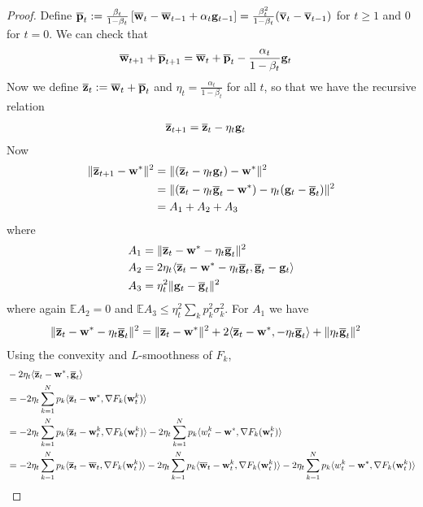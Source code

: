 \begin{proof}
	Define ${\overline{\mathbf{p}}}_{t}:=\frac{\beta_{t}}{1-\beta_{t}}\left[{\overline{\mathbf{w}}}_{t}-{\overline{\mathbf{w}}}_{t-1}+\alpha_{t}{\mathbf{g}}_{t-1}\right]=\frac{\beta_{t}^{2}}{1-\beta_{t}}({\overline{\mathbf{v}}}_{t}-{\overline{\mathbf{v}}}_{t-1})$
	for $t\geq1$ and 0 for $t=0$. We can check that 
	\begin{align*}
	{\overline{\mathbf{w}}}_{t+1}+{\overline{\mathbf{p}}}_{t+1} & ={\overline{\mathbf{w}}}_{t}+{\overline{\mathbf{p}}}_{t}-\frac{\alpha_{t}}{1-\beta_{t}}{\mathbf{g}}_{t}
	\end{align*}
	Now we define ${\overline{\mathbf{z}}}_{t}:={\overline{\mathbf{w}}}_{t}+{\overline{\mathbf{p}}}_{t}$
	and $\eta_{t}=\frac{\alpha_{t}}{1-\beta_{t}}$ for all $t$, so that
	we have the recursive relation 
	\begin{align*}
	{\overline{\mathbf{z}}}_{t+1} & ={\overline{\mathbf{z}}}_{t}-\eta_{t}{\mathbf{g}}_{t}
	\end{align*}
	Now 
	\begin{align*}
	\|{\overline{\mathbf{z}}}_{t+1}-{\mathbf{w}}^{\ast}\|^{2} & =\|({\overline{\mathbf{z}}}_{t}-\eta_{t}{\mathbf{g}}_{t})-{\mathbf{w}}^{\ast}\|^{2}\\
	& =\|({\overline{\mathbf{z}}}_{t}-\eta_{t}{\overline{\mathbf{g}}}_{t}-{\mathbf{w}}^{\ast})-\eta_{t}({\mathbf{g}}_{t}-{\overline{\mathbf{g}}}_{t})\|^{2}\\
	& =A_{1}+A_{2}+A_{3}
	\end{align*}
	where 
	\begin{align*}
	A_{1} & =\|{\overline{\mathbf{z}}}_{t}-{\mathbf{w}}^{\ast}-\eta_{t}{\overline{\mathbf{g}}}_{t}\|^{2}\\
	A_{2} & =2\eta_{t}\langle{\overline{\mathbf{z}}}_{t}-{\mathbf{w}}^{\ast}-\eta_{t}{\overline{\mathbf{g}}}_{t},{\overline{\mathbf{g}}}_{t}-{\mathbf{g}}_{t}\rangle\\
	A_{3} & =\eta_{t}^{2}\|{\mathbf{g}}_{t}-{\overline{\mathbf{g}}}_{t}\|^{2}
	\end{align*}
	where again $\mathbb{E}A_{2}=0$ and $\mathbb{E}A_{3}\leq\eta_{t}^{2}\sum_{k}p_{k}^{2}\sigma_{k}^{2}$.
	For $A_{1}$ we have 
	\begin{align*}
	\|{\overline{\mathbf{z}}}_{t}-{\mathbf{w}}^{\ast}-\eta_{t}{\overline{\mathbf{g}}}_{t}\|^{2} & =\|{\overline{\mathbf{z}}}_{t}-{\mathbf{w}}^{\ast}\|^{2}+2\langle{\overline{\mathbf{z}}}_{t}-{\mathbf{w}}^{\ast},-\eta_{t}{\overline{\mathbf{g}}}_{t}\rangle+\|\eta_{t}{\overline{\mathbf{g}}}_{t}\|^{2}
	\end{align*}
	Using the convexity and $L$-smoothness of $F_{k}$, 
	\begin{align*}
	& -2\eta_{t}\langle\ov{z}_{t}-\vw^{\ast},\ov{g}_{t}\rangle\\
	& =-2\eta_{t}\sum_{k=1}^{N}p_{k}\langle\ov{z}_{t}-\vw^{\ast},\nabla F_{k}(\vw_{t}^{k})\rangle\\
	& =-2\eta_{t}\sum_{k=1}^{N}p_{k}\langle\ov{z}_{t}-\vw_{t}^{k},\nabla F_{k}(\vw_{t}^{k})\rangle-2\eta_{t}\sum_{k=1}^{N}p_{k}\langle w_{t}^{k}-\vw^{\ast},\nabla F_{k}(\vw_{t}^{k})\rangle\\
	& =-2\eta_{t}\sum_{k=1}^{N}p_{k}\langle\ov{z}_{t}-\ov{w}_{t},\nabla F_{k}(\vw_{t}^{k})\rangle-2\eta_{t}\sum_{k=1}^{N}p_{k}\langle\ov{w}_{t}-\vw_{t}^{k},\nabla F_{k}(\vw_{t}^{k})\rangle-2\eta_{t}\sum_{k=1}^{N}p_{k}\langle w_{t}^{k}-\vw^{\ast},\nabla F_{k}(\vw_{t}^{k})\rangle\\

\end{align*}
\end{proof}
